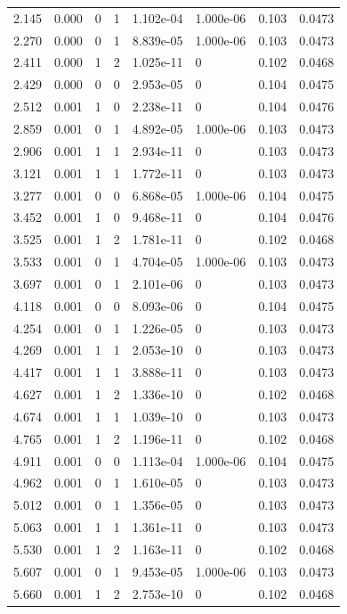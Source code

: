 \documentclass[preview]{standalone}
\begin{document}
{{\begin{tabular}{L{1.2cm}C{1.2cm} C{0.3cm}C{0.5cm} C{1.4cm}C{1.4cm} C{1.4cm}C{1.4cm}}
  2.145  &  0.000  & 0     &  1 &  1.102e-04  & 1.000e-06  & 0.103 &  0.0473   \\ 
  2.270  &  0.000  & 0     &  1 &  8.839e-05  & 1.000e-06  & 0.103 &  0.0473   \\ 
  2.411  &  0.000  & 1     &  2 &  1.025e-11  & 0  & 0.102 &  0.0468   \\ 
  2.429  &  0.000  & 0     &  0 &  2.953e-05  & 0  & 0.104 &  0.0475   \\ 
  2.512  &  0.001  & 1     &  0 &  2.238e-11  & 0  & 0.104 &  0.0476   \\ 
  2.859  &  0.001  & 0     &  1 &  4.892e-05  & 1.000e-06  & 0.103 &  0.0473   \\ 
  2.906  &  0.001  & 1     &  1 &  2.934e-11  & 0  & 0.103 &  0.0473   \\ 
  3.121  &  0.001  & 1     &  1 &  1.772e-11  & 0  & 0.103 &  0.0473   \\ 
  3.277  &  0.001  & 0     &  0 &  6.868e-05  & 1.000e-06  & 0.104 &  0.0475   \\ 
  3.452  &  0.001  & 1     &  0 &  9.468e-11  & 0  & 0.104 &  0.0476   \\ 
  3.525  &  0.001  & 1     &  2 &  1.781e-11  & 0  & 0.102 &  0.0468   \\ 
  3.533  &  0.001  & 0     &  1 &  4.704e-05  & 1.000e-06  & 0.103 &  0.0473   \\ 
  3.697  &  0.001  & 0     &  1 &  2.101e-06  & 0  & 0.103 &  0.0473   \\ 
  4.118  &  0.001  & 0     &  0 &  8.093e-06  & 0  & 0.104 &  0.0475   \\ 
  4.254  &  0.001  & 0     &  1 &  1.226e-05  & 0  & 0.103 &  0.0473   \\ 
  4.269  &  0.001  & 1     &  1 &  2.053e-10  & 0  & 0.103 &  0.0473   \\ 
  4.417  &  0.001  & 1     &  1 &  3.888e-11  & 0  & 0.103 &  0.0473   \\ 
  4.627  &  0.001  & 1     &  2 &  1.336e-10  & 0  & 0.102 &  0.0468   \\ 
  4.674  &  0.001  & 1     &  1 &  1.039e-10  & 0  & 0.103 &  0.0473   \\ 
  4.765  &  0.001  & 1     &  2 &  1.196e-11  & 0  & 0.102 &  0.0468   \\ 
  4.911  &  0.001  & 0     &  0 &  1.113e-04  & 1.000e-06  & 0.104 &  0.0475   \\ 
  4.962  &  0.001  & 0     &  1 &  1.610e-05  & 0  & 0.103 &  0.0473   \\ 
  5.012  &  0.001  & 0     &  1 &  1.356e-05  & 0  & 0.103 &  0.0473   \\ 
  5.063  &  0.001  & 1     &  1 &  1.361e-11  & 0  & 0.103 &  0.0473   \\ 
  5.530  &  0.001  & 1     &  2 &  1.163e-11  & 0  & 0.102 &  0.0468   \\ 
  5.607  &  0.001  & 0     &  1 &  9.453e-05  & 1.000e-06  & 0.103 &  0.0473   \\ 
  5.660  &  0.001  & 1     &  2 &  2.753e-10  & 0  & 0.102 &  0.0468   \\ 
\hline 
\end{tabular} 

}}
\end{document}
